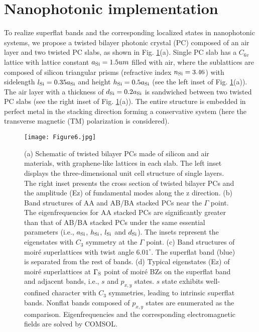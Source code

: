 \documentclass[%
reprint,
amsmath,amssymb,amsfonts
aps,
superscriptaddress,
prx
]{revtex4-1}
\begin{document}
\section{Nanophotonic implementation} 
To realize superflat bands and the corresponding localized states in nanophotonic systems, we propose a twisted bilayer photonic crystal (PC) composed of an air layer and two twisted PC slabs, as shown in Fig. \ref{fig:6}(a). Single PC slab has a $C_{6v}$ lattice with lattice constant $a_{\rm Si}=1.5um$ filled with air, where the sublattices are composed of silicon triangular prisms (refractive index $n_{\rm Si}=3.46$) with sidelength $l_{\rm Si}=0.35a_{\rm Si}$ and height $h_{\rm Si}=0.5a_{\rm Si}$ (see the left inset of Fig. \ref{fig:6}(a)). The air layer with a thickness of $d_{\rm Si}=0.2a_{\rm Si}$ is sandwiched between two twisted PC slabs (see the right inset of Fig. \ref{fig:6}(a)). The entire structure is embedded in perfect metal in the stacking direction forming a conservative system (here the transverse magnetic (TM) polarization is considered). 
\begin{figure*}
\texttt{[image: Figure6.jpg]}%
\caption{(a) Schematic of twisted bilayer PCs made of silicon and air materials, with graphene-like lattices in each slab. 
The left inset displays the three-dimensional unit cell structure of single layers. The right inset presents the cross section of twisted bilayer PCs and the amplitude (Ez) of fundamental modes along the z direction. 
(b) Band structures of AA and AB/BA stacked PCs near the $\Gamma$ point. The eigenfrequencies for AA stacked PCs are significantly greater than that of AB/BA stacked PCs under the same essential parameters (i.e., $a_{\rm Si}$, $h_{\rm Si}$, $l_{\rm Si}$ and $d_{\rm Si}$). The insets represent the eigenstates with $C_3$ symmetry at the $\Gamma$ point. 
(c) Band structures of moir\'e superlattices with twist angle $6.01^{\circ}$. The superflat band (blue) is separated from the rest of bands. 
(d) Typical eigenstates (Ez) of moir\'e superlattices at ${\rm \Gamma_S}$ point of moir\'e BZs on the superflat band and adjacent bands, i.e., $s$ and $p_{x,y}$ states. $s$ state exhibits well-confined character with $C_3$ symmetries, leading to intrinsic superflat bands. Nonflat bands composed of $p_{x,y}$ states are enumerated as the comparison. Eigenfrequencies and the corresponding electromagnetic fields are solved by COMSOL.}
\label{fig:6}
\end{figure*}%
\end{document}
